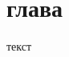 \documentclass[a4paper,article,14pt]{extarticle}
\begin{document}


\tableofcontents
\pagebreak






\section{глава}

текст




\end{document}
